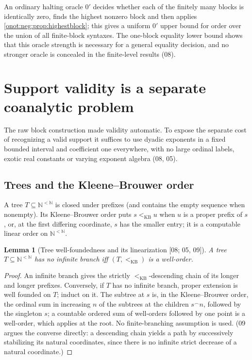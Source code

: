 \documentclass[11pt,oneside]{article}
\numberwithin{equation}{section}
\newtheorem{lemma}[lemma]{Lemma}
\theoremstyle{definition}
\theoremstyle{remark}
\newcommand{\N}{\mathbb N}
\newcommand{\kb}{<_{\mathrm{KB}}}
\newcommand{\src}[1]{\textup{\textsf{\small[#1]}}}
\begin{document}
An ordinary halting oracle $0'$ decides whether each of the finitely many blocks is
identically zero, finds the highest nonzero block and then applies
\cref{onot:neg:prop:highestblock}; this gives a uniform $0'$ upper bound for order
over the union of all finite-block syntaxes. The one-block equality lower bound
shows that this oracle strength is necessary for a general equality decision, and
no stronger oracle is concealed in the finite-level results (08).

\section{Support validity is a separate coanalytic problem}\label{onot:neg:sec:validity}

The raw block construction made validity automatic. To expose the separate cost of
recognizing a valid support it suffices to use dyadic exponents in a fixed bounded
interval and coefficient one everywhere, with no large ordinal labels, exotic real
constants or varying exponent algebra (08, 05).

\subsection{Trees and the Kleene--Brouwer order}

A tree $T\subseteq\N^{<\N}$ is closed under prefixes (and contains the empty
sequence when nonempty). Its Kleene--Brouwer order puts $s\kb u$ when $u$ is a
proper prefix of $s$, or, at the first differing coordinate, $s$ has the smaller
entry; it is a computable linear order on $\N^{<\N}$.

\begin{lemma}[Tree well-foundedness and its linearization \src{08; 05, 09}]\label{onot:neg:lem:kbtree}
A tree $T\subseteq\N^{<\N}$ has no infinite branch iff $(T,\kb)$ is a well-order.
\end{lemma}
\begin{proof}
An infinite branch gives the strictly $\kb$-descending chain of its longer and
longer prefixes. Conversely, if $T$ has no infinite branch, proper extension is
well founded on $T$; induct on it. The subtree at $s$ is, in the
Kleene--Brouwer order, the ordinal sum in increasing $n$ of the subtrees at the
children $s^\frown n$, followed by the singleton $s$; a countable ordered sum of
well-orders followed by one point is a well-order, which applies at the root. No
finite-branching assumption is used. (09 argues the converse directly: a
descending chain yields a path by successively stabilizing its natural
coordinates, since there is no infinite strict decrease of a natural coordinate.)
\end{proof}
\end{document}
